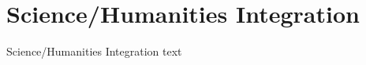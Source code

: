 
\section{Science/Humanities Integration}\fbeg{}\begin{frame}{}

{\fontsize{20}{23}\selectfont

Science/Humanities Integration text

}

\end{frame}

